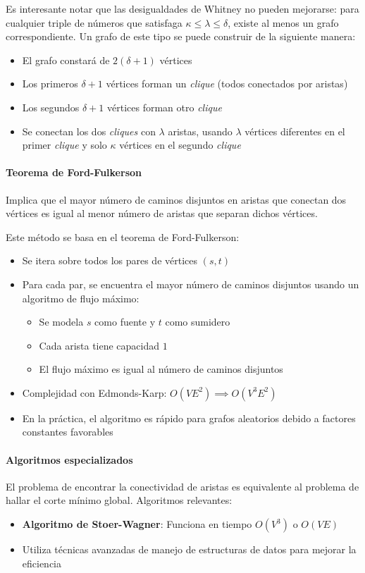 \documentclass[a4paper]{article}
\begin{document}
Es interesante notar que las desigualdades de Whitney no pueden mejorarse: para cualquier triple de números que satisfaga \(\kappa \leq \lambda \leq \delta\), existe al menos un grafo correspondiente. Un grafo de este tipo se puede construir de la siguiente manera:
\begin{itemize}
    \item El grafo constará de \(2(\delta + 1)\) vértices
    \item Los primeros \(\delta + 1\) vértices forman un \textit{clique} (todos conectados por aristas)
    \item Los segundos \(\delta + 1\) vértices forman otro \textit{clique}
    \item Se conectan los dos \textit{cliques} con \(\lambda\) aristas, usando \(\lambda\) vértices diferentes en el primer \textit{clique} y solo \(\kappa\) vértices en el segundo \textit{clique}
\end{itemize}

\paragraph{Teorema de Ford-Fulkerson}
Implica que el mayor número de caminos disjuntos en aristas que conectan dos vértices es igual al menor número de aristas que separan dichos vértices.

Este método se basa en el teorema de Ford-Fulkerson:
\begin{itemize}
    \item Se itera sobre todos los pares de vértices \((s, t)\)
    \item Para cada par, se encuentra el mayor número de caminos disjuntos usando un algoritmo de flujo máximo:
    \begin{itemize}
        \item Se modela \(s\) como fuente y \(t\) como sumidero
        \item Cada arista tiene capacidad \(1\)
        \item El flujo máximo es igual al número de caminos disjuntos
    \end{itemize}
    \item Complejidad con Edmonds-Karp: \(O(V E^2) \implies O(V^3 E^2)\)
    \item En la práctica, el algoritmo es rápido para grafos aleatorios debido a factores constantes favorables
\end{itemize}

\paragraph{Algoritmos especializados}
El problema de encontrar la conectividad de aristas es equivalente al problema de hallar el corte mínimo global. Algoritmos relevantes:
\begin{itemize}
    \item \textbf{Algoritmo de Stoer-Wagner}: Funciona en tiempo \(O(V^3)\) o \(O(V E)\)
    \item Utiliza técnicas avanzadas de manejo de estructuras de datos para mejorar la eficiencia
\end{itemize}
\end{document}
